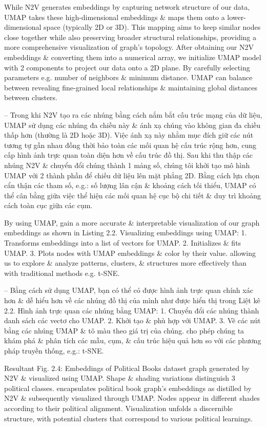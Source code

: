 \documentclass{article}
\begin{document}
\begin{itemize}
\begin{itemize}
\begin{itemize}
           While N2V generates embeddings by capturing network structure of our data, UMAP takes these high-dimensional embeddings \& maps them onto a lower-dimensional space (typically 2D or 3D). This mapping aims to keep similar nodes close together while also preserving broader structural relationships, providing a more comprehensive visualization of graph's topology. After obtaining our N2V embeddings \& converting them into a numerical array, we initialize UMAP model with 2 components to project our data onto a 2D plane. By carefully selecting parameters e.g. number of neighbors \& minimum distance. UMAP can balance between revealing fine-grained local relationships \& maintaining global distances between clusters.

           -- Trong khi N2V tạo ra các nhúng bằng cách nắm bắt cấu trúc mạng của dữ liệu, UMAP sử dụng các nhúng đa chiều này \& ánh xạ chúng vào không gian đa chiều thấp hơn (thường là 2D hoặc 3D). Việc ánh xạ này nhằm mục đích giữ các nút tương tự gần nhau đồng thời bảo toàn các mối quan hệ cấu trúc rộng hơn, cung cấp hình ảnh trực quan toàn diện hơn về cấu trúc đồ thị. Sau khi thu thập các nhúng N2V \& chuyển đổi chúng thành 1 mảng số, chúng tôi khởi tạo mô hình UMAP với 2 thành phần để chiếu dữ liệu lên mặt phẳng 2D. Bằng cách lựa chọn cẩn thận các tham số, e.g.: số lượng lân cận \& khoảng cách tối thiểu, UMAP có thể cân bằng giữa việc thể hiện các mối quan hệ cục bộ chi tiết \& duy trì khoảng cách toàn cục giữa các cụm.

           By using UMAP, gain a more accurate \& interpretable visualization of our graph embeddings as shown in {\sf Listing 2.2. Visualizing embeddings using UMAP: 1. Transforms embeddings into a list of vectors for UMAP. 2. Initializes \& fits UMAP. 3. Plots nodes with UMAP embeddings \& color by their value.} allowing us to explore \& analyze patterns, clusters, \& structures more effectively than with traditional methods e.g. t-SNE.

           -- Bằng cách sử dụng UMAP, bạn có thể có được hình ảnh trực quan chính xác hơn \& dễ hiểu hơn về các nhúng đồ thị của mình như được hiển thị trong {\sf Liệt kê 2.2. Hình ảnh trực quan các nhúng bằng UMAP: 1. Chuyển đổi các nhúng thành danh sách các vectơ cho UMAP. 2. Khởi tạo \& phù hợp với UMAP. 3. Vẽ các nút bằng các nhúng UMAP \& tô màu theo giá trị của chúng.} cho phép chúng ta khám phá \& phân tích các mẫu, cụm, \& cấu trúc hiệu quả hơn so với các phương pháp truyền thống, e.g.: t-SNE.

           Resultant {\sf Fig. 2.4: Embeddings of Political Books dataset graph generated by N2V \& visualized using UMAP. Shape \& shading variations distinguish 3 political classes.} encapsulates political book graph's embeddings as distilled by N2V \& subsequently visualized through UMAP. Nodes appear in different shades according to their political alignment. Visualization unfolds a discernible structure, with potential clusters that correspond to various political learnings.


\end{itemize}
\end{itemize}
\end{itemize}
\end{document}
